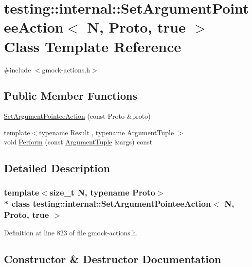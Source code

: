 \hypertarget{classtesting_1_1internal_1_1_set_argument_pointee_action_3_01_n_00_01_proto_00_01true_01_4}{}\section{testing\+:\+:internal\+:\+:Set\+Argument\+Pointee\+Action$<$ N, Proto, true $>$ Class Template Reference}
\label{classtesting_1_1internal_1_1_set_argument_pointee_action_3_01_n_00_01_proto_00_01true_01_4}


{\ttfamily \#include $<$gmock-\/actions.\+h$>$}

\subsection*{Public Member Functions}
\begin{DoxyCompactItemize}
\item 
\hyperlink{classtesting_1_1internal_1_1_set_argument_pointee_action_3_01_n_00_01_proto_00_01true_01_4_af08b3a61e483f704e93872987d30ade0}{Set\+Argument\+Pointee\+Action} (const Proto \&proto)
\item 
{\footnotesize template$<$typename Result , typename Argument\+Tuple $>$ }\\void \hyperlink{classtesting_1_1internal_1_1_set_argument_pointee_action_3_01_n_00_01_proto_00_01true_01_4_a77f33bf36443aba70e77d515b162ae24}{Perform} (const \hyperlink{typedefs__d_8js_a396b2bdc7ef45f482a7e9254b15c3c01}{Argument\+Tuple} \&args) const 
\end{DoxyCompactItemize}


\subsection{Detailed Description}
\subsubsection*{template$<$size\+\_\+t N, typename Proto$>$\\*
class testing\+::internal\+::\+Set\+Argument\+Pointee\+Action$<$ N, Proto, true $>$}



Definition at line 823 of file gmock-\/actions.\+h.



\subsection{Constructor \& Destructor Documentation}
